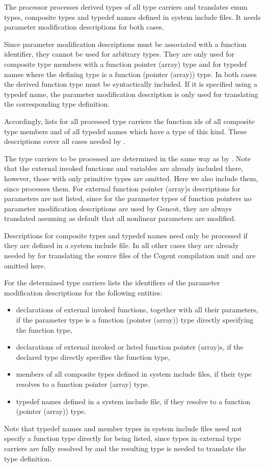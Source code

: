 The processor  processes derived types of all type carriers and translates enum types,
composite types and typedef names defined in system include files. It needs parameter modification descriptions
for both cases. 

Since parameter modification descriptions must be associated with a function identifier, they cannot be used
for arbitrary types. They are only used for composite type members with a function pointer (array) type and 
for typedef names where the defining type is a function (pointer (array)) type. In both cases the derived
function type must be syntactically included. If it is specified using a typedef name, the parameter modification
description is only used for translating the corresponding type definition.

Accordingly,  lists for all processed type carriers the function ids of all composite type
members and of all typedef names which have a type of this kind. These descriptions cover all cases needed
by .

The type carriers to be processed are determined in the same way as by . Note that the 
external invoked functions and variables are already included there, however, those with only primitive types are omitted.
Here we also include them, since  processes them. 
For external function pointer (array)s descriptions for parameters are not listed, since
for the parameter types of function pointers no parameter modification descriptions are used by Gencot, they
are always translated assuming as default that all nonlinear parameters are modified.

Descriptions for composite types and typedef names need only be processed if they are defined in a system include
file. In all other cases they are already needed by  for translating the source files
of the Cogent compilation unit and are omitted here.

For the determined type carriers  lists the identifiers of 
the parameter modification descriptions for the following entities:
\begin{itemize}
\item declarations of external invoked functions, together with all their parameters, if the parameter
type is a function (pointer (array)) type directly specifying the function type,
\item declarations of external invoked or listed function pointer (array)s, if the declared type directly specifies
the function type,
\item members of all composite types defined in system include files, if their type resolves to a function pointer (array) type.
\item typedef names defined in a system include file, if they resolve to a function (pointer (array)) type.
\end{itemize}

Note that typedef names and member types in system include files need not specify a function type directly for being listed, 
since types in external type carriers are fully resolved by  and the resulting type is needed to translate 
the type definition.
